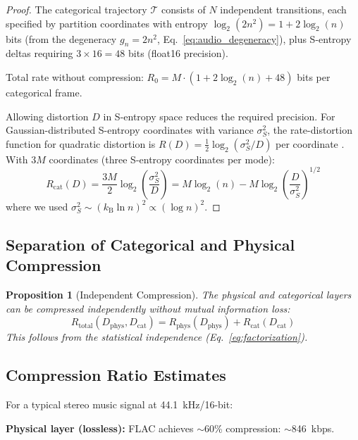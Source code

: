 \documentclass[twocolumn,10pt]{article}
\newtheorem{proposition}[theorem]{Proposition}
\theoremstyle{remark}
\newcommand{\kB}{k_{\mathrm{B}}}
\newcommand{\calT}{\mathcal{T}}
\begin{document}
\begin{proof}
The categorical trajectory $\calT$ consists of $N$ independent transitions, each specified by partition coordinates with entropy $\log_2(2n^2) = 1 + 2\log_2(n)$ bits (from the degeneracy $g_n = 2n^2$, Eq.~\ref{eq:audio_degeneracy}), plus S-entropy deltas requiring $3 \times 16 = 48$ bits (float16 precision).

Total rate without compression: $R_0 = M \cdot (1 + 2\log_2(n) + 48)$ bits per categorical frame.

Allowing distortion $D$ in S-entropy space reduces the required precision. For Gaussian-distributed S-entropy coordinates with variance $\sigma_S^2$, the rate-distortion function for quadratic distortion is $R(D) = \frac{1}{2}\log_2(\sigma_S^2/D)$ per coordinate \cite{cover2006}. With $3M$ coordinates (three S-entropy coordinates per mode):
\begin{equation}
    R_{\mathrm{cat}}(D) = \frac{3M}{2} \log_2\!\left(\frac{\sigma_S^2}{D}\right) = M \log_2(n) - M\log_2\!\left(\frac{D}{\sigma_S^2}\right)^{1/2}
\end{equation}
where we used $\sigma_S^2 \sim (\kB \ln n)^2 \propto (\log n)^2$.
\end{proof}

\subsection{Separation of Categorical and Physical Compression}

\begin{proposition}[Independent Compression]
\label{prop:independent_compression}
The physical and categorical layers can be compressed independently without mutual information loss:
\begin{equation}
    R_{\mathrm{total}}(D_{\mathrm{phys}}, D_{\mathrm{cat}}) = R_{\mathrm{phys}}(D_{\mathrm{phys}}) + R_{\mathrm{cat}}(D_{\mathrm{cat}})
    \label{eq:independent_compression}
\end{equation}
This follows from the statistical independence (Eq.~\ref{eq:factorization}).
\end{proposition}

\subsection{Compression Ratio Estimates}

For a typical stereo music signal at 44.1~kHz/16-bit:

\textbf{Physical layer (lossless):} FLAC achieves $\sim$60\% compression: $\sim$846~kbps.
\end{document}
